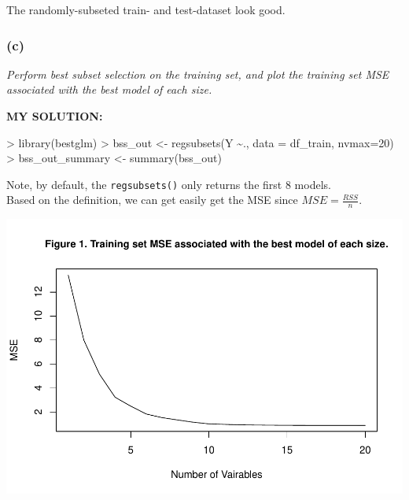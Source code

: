 \documentclass[
]{article}
\newenvironment{Shaded}{\begin{snugshade}}{\end{snugshade}}
\newcommand{\AttributeTok}[1]{\textcolor[rgb]{0.77,0.63,0.00}{#1}}
\newcommand{\DecValTok}[1]{\textcolor[rgb]{0.00,0.00,0.81}{#1}}
\newcommand{\FunctionTok}[1]{\textcolor[rgb]{0.00,0.00,0.00}{#1}}
\newcommand{\NormalTok}[1]{#1}
\newcommand{\OtherTok}[1]{\textcolor[rgb]{0.56,0.35,0.01}{#1}}
\newcommand{\SpecialCharTok}[1]{\textcolor[rgb]{0.00,0.00,0.00}{#1}}
\newcommand{\StringTok}[1]{\textcolor[rgb]{0.31,0.60,0.02}{#1}}
\begin{document}
The randomly-subseted train- and test-dataset look good.

\hypertarget{c}{%
\subsubsection{(c)}\label{c}}

\emph{Perform best subset selection on the training set, and plot the
training set MSE associated with the best model of each size.}

\textbf{MY SOLUTION:}

\begin{Shaded}
\begin{Highlighting}[]
\SpecialCharTok{\textgreater{}} \FunctionTok{library}\NormalTok{(bestglm)}
\SpecialCharTok{\textgreater{}}\NormalTok{ bss\_out }\OtherTok{\textless{}{-}} \FunctionTok{regsubsets}\NormalTok{(Y }\SpecialCharTok{\textasciitilde{}}\NormalTok{., }\AttributeTok{data =}\NormalTok{ df\_train, }\AttributeTok{nvmax=}\DecValTok{20}\NormalTok{)}
\SpecialCharTok{\textgreater{}}\NormalTok{ bss\_out\_summary }\OtherTok{\textless{}{-}} \FunctionTok{summary}\NormalTok{(bss\_out)}
\end{Highlighting}
\end{Shaded}

Note, by default, the \texttt{regsubsets()} only returns the first 8
models.\\
Based on the definition, we can get easily get the MSE since
\(MSE = \frac{RSS}{n}\).

\begin{Shaded}
\end{Shaded}

\includegraphics[width=0.5\linewidth,height=0.5\textheight]{Homework_10_Pan_files/figure-latex/unnamed-chunk-4-1}
\end{document}
